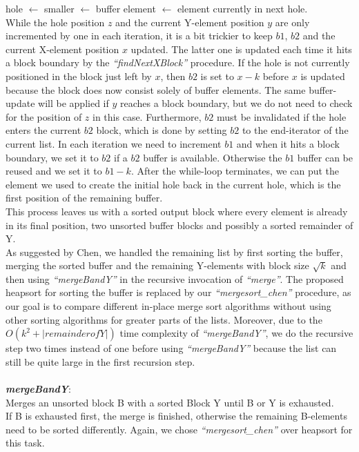 \documentclass[11pt,pdftex,a4paper, twocolumn]{article}
\begin{document}
hole $\leftarrow$ smaller $\leftarrow$ buffer element $\leftarrow$ element currently in next hole. \\
While the hole position $z$ and the current Y-element position $y$ are only incremented by one in each iteration, it is a bit trickier to keep $b1$, $b2$ and the current X-element position $x$ updated. The latter one is updated each time it hits a block boundary by the \textit{“findNextXBlock”} procedure. If the hole is not currently positioned in the block just left by $x$, then $b2$ is set to $x-k$ before $x$ is updated because the block does now consist solely of buffer elements. The same buffer-update will be applied if $y$ reaches a block boundary, but we do not need to check for the position of $z$ in this case. Furthermore, $b2$ must be invalidated if the hole enters the current $b2$ block, which is done by setting $b2$ to the end-iterator of the current list. In each iteration we need to increment $b1$ and when it hits a block boundary, we set it to $b2$ if a $b2$ buffer is available. Otherwise the $b1$ buffer can be reused and we set it to $b1-k$. After the while-loop terminates, we can put the element we used to create the initial hole back in the current hole, which is the first position of the remaining buffer. \\
This process leaves us with a sorted output block where every element is already in its final position, two unsorted buffer blocks and possibly a sorted remainder of Y. \\
As suggested by Chen, we handled the remaining list by first sorting the buffer, merging the sorted buffer and the remaining Y-elements with block size $\sqrt{k}$ and then using \textit{“mergeBandY”} in the recursive invocation of \textit{“merge”}. The proposed heapsort for sorting the buffer is replaced by our \textit{“mergesort\_chen”} procedure, as our goal is to compare different in-place merge sort algorithms without using other sorting algorithms for greater parts of the lists. Moreover, due to the $O(k^{2}+|remainder of Y|)$ time complexity of \textit{“mergeBandY”}, we do the recursive step two times instead of one before using \textit{“mergeBandY”} because the list can still be quite large in the first recursion step. \\
$ $ \\
\textbf{\textit{mergeBandY}}: \\
Merges an unsorted block B with a sorted Block Y until B or Y is exhausted. \\
If B is exhausted first, the merge is finished, otherwise the remaining B-elements need to be sorted differently. Again, we chose \textit{“mergesort\_chen”} over heapsort for this task. \\
\end{document}
